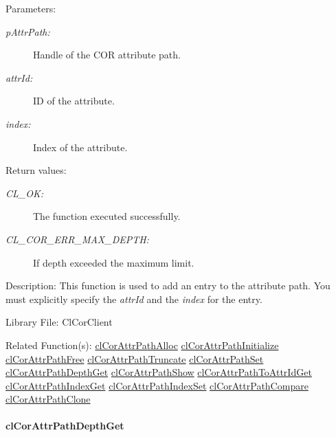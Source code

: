 \begin{Desc}
\item[Parameters:]
\begin{description}
\item[{\em p\-Attr\-Path:}]Handle of the COR attribute path. \item[{\em attr\-Id:}]ID of the attribute. \item[{\em index:}]Index of the attribute.\end{description}
\end{Desc}
\begin{Desc}
\item[Return values:]
\begin{description}
\item[{\em CL\_\-OK:}]The function executed successfully. \item[{\em CL\_\-COR\_\-ERR\_\-MAX\_\-DEPTH:}]If depth exceeded the maximum limit.\end{description}
\end{Desc}
\begin{Desc}
\item[Description:]This function is used to add an entry to the attribute path. You must explicitly specify the {\em attr\-Id\/} and the {\em index\/} for the entry.\end{Desc}
\begin{Desc}
\item[Library File:]Cl\-Cor\-Client\end{Desc}
\begin{Desc}
\item[Related Function(s):]\hyperlink{group__group13}{cl\-Cor\-Attr\-Path\-Alloc} \hyperlink{group__group13}{cl\-Cor\-Attr\-Path\-Initialize} \hyperlink{group__group13}{cl\-Cor\-Attr\-Path\-Free} \hyperlink{group__group13}{cl\-Cor\-Attr\-Path\-Truncate} \hyperlink{group__group13}{cl\-Cor\-Attr\-Path\-Set} \hyperlink{group__group13}{cl\-Cor\-Attr\-Path\-Depth\-Get} \hyperlink{group__group13}{cl\-Cor\-Attr\-Path\-Show} \hyperlink{group__group13}{cl\-Cor\-Attr\-Path\-To\-Attr\-Id\-Get} \hyperlink{group__group13}{cl\-Cor\-Attr\-Path\-Index\-Get} \hyperlink{group__group13}{cl\-Cor\-Attr\-Path\-Index\-Set} \hyperlink{group__group13}{cl\-Cor\-Attr\-Path\-Compare} \hyperlink{group__group13}{cl\-Cor\-Attr\-Path\-Clone} \end{Desc}
\hypertarget{pagecor261}{}\paragraph{cl\-Cor\-Attr\-Path\-Depth\-Get}\label{pagecor261}
